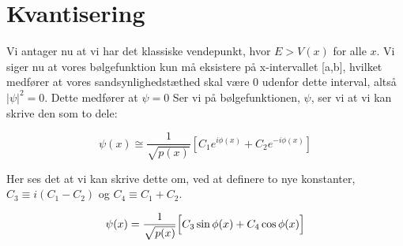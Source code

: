 \section{Kvantisering}
Vi antager nu at vi har det klassiske vendepunkt, hvor $E > V(x) $ for alle $ x$. Vi siger nu at vores bølgefunktion kun må eksistere på x-intervallet [a,b], hvilket medfører at vores sandsynlighedstæthed skal være 0 udenfor dette interval, altså $|\psi|^2 = 0$. Dette medfører at $\psi = 0$
Ser vi på bølgefunktionen, $\psi$, ser vi at vi kan skrive den som to dele:

\begin{equation}
  \psi(x) \cong \frac{1}{\sqrt{p(x)}}\left[C_1e^{i\phi(x)}+C_2e^{-i\phi(x)}\right]
  \label{eq:kvantiseringStart}
\end{equation}

Her ses det at vi kan skrive dette om, ved at definere to nye konstanter, $C_3 \equiv i(C_1-C_2)$ og $C_4 \equiv C_1+C_2$.

\begin{equation}
  \psi(x) = \frac{1}{\sqrt{p(x)}}
  \Bigl[    C_3\sin{\phi(x)}+C_4\cos{\phi(x)}   \Bigr]
  \label{eq:kvantiseringSinCos}
\end{equation}
